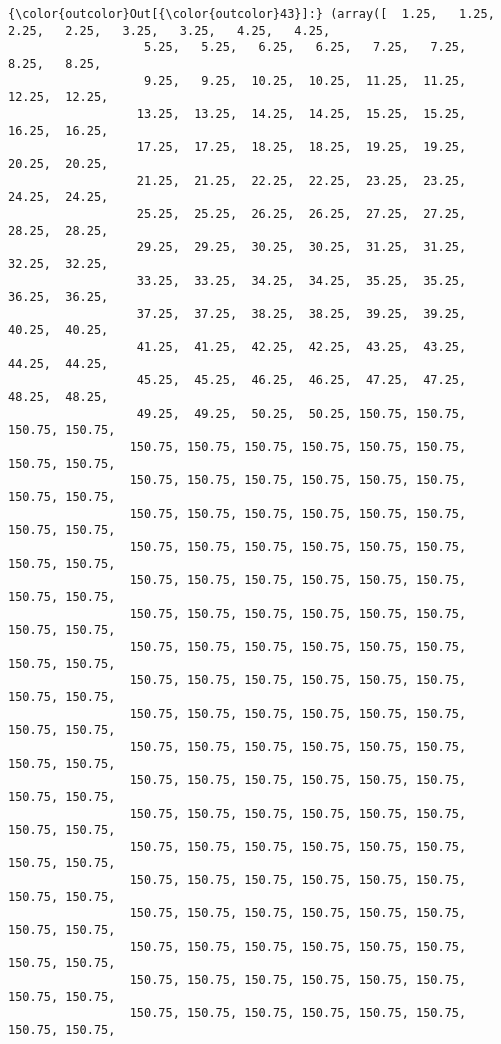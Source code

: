 \documentclass[11pt]{article}
\begin{document}
\begin{Verbatim}[commandchars=\\\{\}]
{\color{outcolor}Out[{\color{outcolor}43}]:} (array([  1.25,   1.25,   2.25,   2.25,   3.25,   3.25,   4.25,   4.25,
                   5.25,   5.25,   6.25,   6.25,   7.25,   7.25,   8.25,   8.25,
                   9.25,   9.25,  10.25,  10.25,  11.25,  11.25,  12.25,  12.25,
                  13.25,  13.25,  14.25,  14.25,  15.25,  15.25,  16.25,  16.25,
                  17.25,  17.25,  18.25,  18.25,  19.25,  19.25,  20.25,  20.25,
                  21.25,  21.25,  22.25,  22.25,  23.25,  23.25,  24.25,  24.25,
                  25.25,  25.25,  26.25,  26.25,  27.25,  27.25,  28.25,  28.25,
                  29.25,  29.25,  30.25,  30.25,  31.25,  31.25,  32.25,  32.25,
                  33.25,  33.25,  34.25,  34.25,  35.25,  35.25,  36.25,  36.25,
                  37.25,  37.25,  38.25,  38.25,  39.25,  39.25,  40.25,  40.25,
                  41.25,  41.25,  42.25,  42.25,  43.25,  43.25,  44.25,  44.25,
                  45.25,  45.25,  46.25,  46.25,  47.25,  47.25,  48.25,  48.25,
                  49.25,  49.25,  50.25,  50.25, 150.75, 150.75, 150.75, 150.75,
                 150.75, 150.75, 150.75, 150.75, 150.75, 150.75, 150.75, 150.75,
                 150.75, 150.75, 150.75, 150.75, 150.75, 150.75, 150.75, 150.75,
                 150.75, 150.75, 150.75, 150.75, 150.75, 150.75, 150.75, 150.75,
                 150.75, 150.75, 150.75, 150.75, 150.75, 150.75, 150.75, 150.75,
                 150.75, 150.75, 150.75, 150.75, 150.75, 150.75, 150.75, 150.75,
                 150.75, 150.75, 150.75, 150.75, 150.75, 150.75, 150.75, 150.75,
                 150.75, 150.75, 150.75, 150.75, 150.75, 150.75, 150.75, 150.75,
                 150.75, 150.75, 150.75, 150.75, 150.75, 150.75, 150.75, 150.75,
                 150.75, 150.75, 150.75, 150.75, 150.75, 150.75, 150.75, 150.75,
                 150.75, 150.75, 150.75, 150.75, 150.75, 150.75, 150.75, 150.75,
                 150.75, 150.75, 150.75, 150.75, 150.75, 150.75, 150.75, 150.75,
                 150.75, 150.75, 150.75, 150.75, 150.75, 150.75, 150.75, 150.75,
                 150.75, 150.75, 150.75, 150.75, 150.75, 150.75, 150.75, 150.75,
                 150.75, 150.75, 150.75, 150.75, 150.75, 150.75, 150.75, 150.75,
                 150.75, 150.75, 150.75, 150.75, 150.75, 150.75, 150.75, 150.75,
                 150.75, 150.75, 150.75, 150.75, 150.75, 150.75, 150.75, 150.75,
                 150.75, 150.75, 150.75, 150.75, 150.75, 150.75, 150.75, 150.75,
                 150.75, 150.75, 150.75, 150.75, 150.75, 150.75, 150.75, 150.75,

\end{Verbatim}
\end{document}
